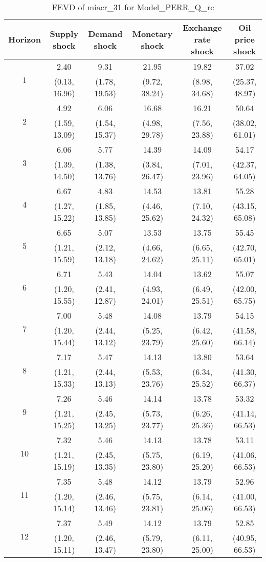 \documentclass{article}
\begin{document}
\begin{table}
	\footnotesize
	\caption{FEVD of miacr_31 for Model_PERR_Q_rc}
	\begin{tabular}{cccccc}
		Horizon & Supply shock & Demand shock & Monetary shock & Exchange rate shock & Oil price shock\\ \hline
		\multirow{2}{*}{1} & 2.40 & 9.31 & 21.95 & 19.82 & 37.02\\
		 & (0.13, 16.96) & (1.78, 19.53) & (9.72, 38.24) & (8.98, 34.68) & (25.37, 48.97)\\
		\multirow{2}{*}{2} & 4.92 & 6.06 & 16.68 & 16.21 & 50.64\\
		 & (1.59, 13.09) & (1.54, 15.37) & (4.98, 29.78) & (7.56, 23.88) & (38.02, 61.01)\\
		\multirow{2}{*}{3} & 6.06 & 5.77 & 14.39 & 14.09 & 54.17\\
		 & (1.39, 14.50) & (1.38, 13.76) & (3.84, 26.47) & (7.01, 23.96) & (42.37, 64.05)\\
		\multirow{2}{*}{4} & 6.67 & 4.83 & 14.53 & 13.81 & 55.28\\
		 & (1.27, 15.22) & (1.85, 13.85) & (4.46, 25.62) & (7.10, 24.32) & (43.15, 65.08)\\
		\multirow{2}{*}{5} & 6.65 & 5.07 & 13.53 & 13.75 & 55.45\\
		 & (1.21, 15.59) & (2.12, 13.18) & (4.66, 24.62) & (6.65, 25.11) & (42.70, 65.01)\\
		\multirow{2}{*}{6} & 6.71 & 5.43 & 14.04 & 13.62 & 55.07\\
		 & (1.20, 15.55) & (2.41, 12.87) & (4.93, 24.01) & (6.49, 25.51) & (42.00, 65.75)\\
		\multirow{2}{*}{7} & 7.00 & 5.48 & 14.08 & 13.79 & 54.15\\
		 & (1.20, 15.44) & (2.44, 13.12) & (5.25, 23.79) & (6.42, 25.60) & (41.58, 66.14)\\
		\multirow{2}{*}{8} & 7.17 & 5.47 & 14.13 & 13.80 & 53.64\\
		 & (1.21, 15.33) & (2.44, 13.13) & (5.53, 23.76) & (6.34, 25.52) & (41.30, 66.37)\\
		\multirow{2}{*}{9} & 7.26 & 5.46 & 14.14 & 13.78 & 53.32\\
		 & (1.21, 15.25) & (2.45, 13.25) & (5.73, 23.77) & (6.26, 25.36) & (41.14, 66.53)\\
		\multirow{2}{*}{10} & 7.32 & 5.46 & 14.13 & 13.78 & 53.11\\
		 & (1.21, 15.19) & (2.45, 13.35) & (5.75, 23.80) & (6.19, 25.20) & (41.06, 66.53)\\
		\multirow{2}{*}{11} & 7.35 & 5.48 & 14.12 & 13.79 & 52.96\\
		 & (1.20, 15.14) & (2.46, 13.46) & (5.75, 23.81) & (6.14, 25.06) & (41.00, 66.53)\\
		\multirow{2}{*}{12} & 7.37 & 5.49 & 14.12 & 13.79 & 52.85\\
		 & (1.20, 15.11) & (2.46, 13.47) & (5.79, 23.80) & (6.11, 25.00) & (40.95, 66.53)\\
	\end{tabular}
\label{tab:fevd-Model_PERR_Q_rc-miacr_31}
\end{table}
\end{document}

